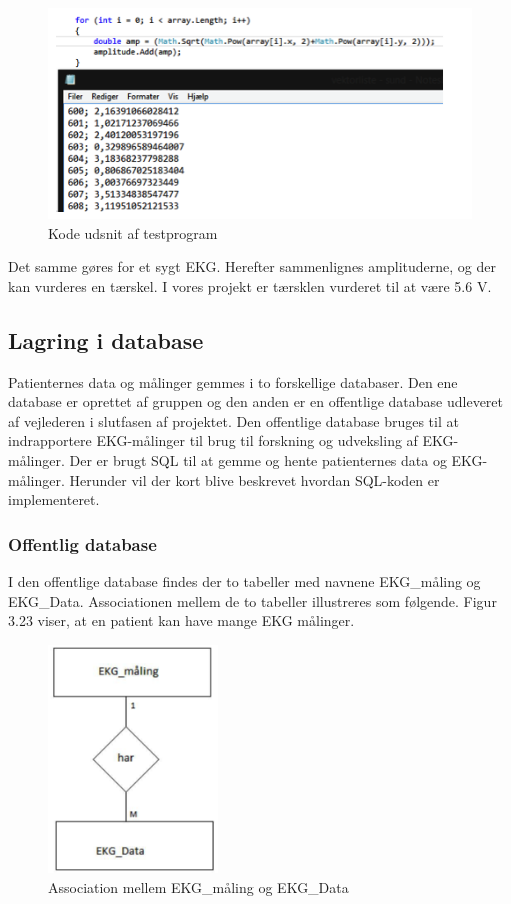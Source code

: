 \begin{figure}[H]
	\centering
	\includegraphics[width=1\textwidth]{Figurer/Snip20150520_13}
	\caption{Kode udsnit af testprogram}
\end{figure}

Det samme gøres for et sygt EKG. Herefter sammenlignes amplituderne, og der kan vurderes en tærskel. I vores projekt er tærsklen vurderet til at være 5.6 V. 

\subsection{Lagring i database}
Patienternes data og målinger gemmes i to forskellige databaser. Den ene database er oprettet af gruppen og den anden er en offentlige database udleveret af vejlederen i slutfasen af projektet. Den offentlige database bruges til at indrapportere EKG-målinger til brug til forskning og udveksling af EKG-målinger.  Der er brugt SQL til at gemme og hente patienternes data og EKG-målinger. Herunder vil der kort blive beskrevet hvordan SQL-koden er implementeret. 

\subsubsection{Offentlig database}
I den offentlige database findes der to tabeller med navnene EKG\_måling og EKG\_Data. Associationen mellem de to tabeller illustreres som følgende. Figur 3.23 viser, at en patient kan have mange EKG målinger. 

\begin{figure}[H]
	\centering
	\includegraphics[width=0.4\textwidth]{Figurer/Snip20150525_38}
	\caption{Association mellem EKG\_måling og EKG\_Data}
\end{figure}

